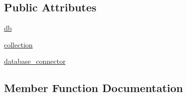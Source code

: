 \subsection*{Public Attributes}
\begin{DoxyCompactItemize}
\item 
\hyperlink{classNEAT__PyGenetics_1_1NEAT_1_1Tests_1_1RepositoryTests_1_1test__databaseConnector_1_1DatabaseConnectorTest_a9115740100acd95dbd3a72371acfe681}{db}
\item 
\hyperlink{classNEAT__PyGenetics_1_1NEAT_1_1Tests_1_1RepositoryTests_1_1test__databaseConnector_1_1DatabaseConnectorTest_aca0cb75295bf0c9964cceef08fa98b7b}{collection}
\item 
\hyperlink{classNEAT__PyGenetics_1_1NEAT_1_1Tests_1_1RepositoryTests_1_1test__databaseConnector_1_1DatabaseConnectorTest_aafa6c5991087684c1187c529c8f76682}{database\+\_\+connector}
\end{DoxyCompactItemize}


\subsection{Member Function Documentation}
